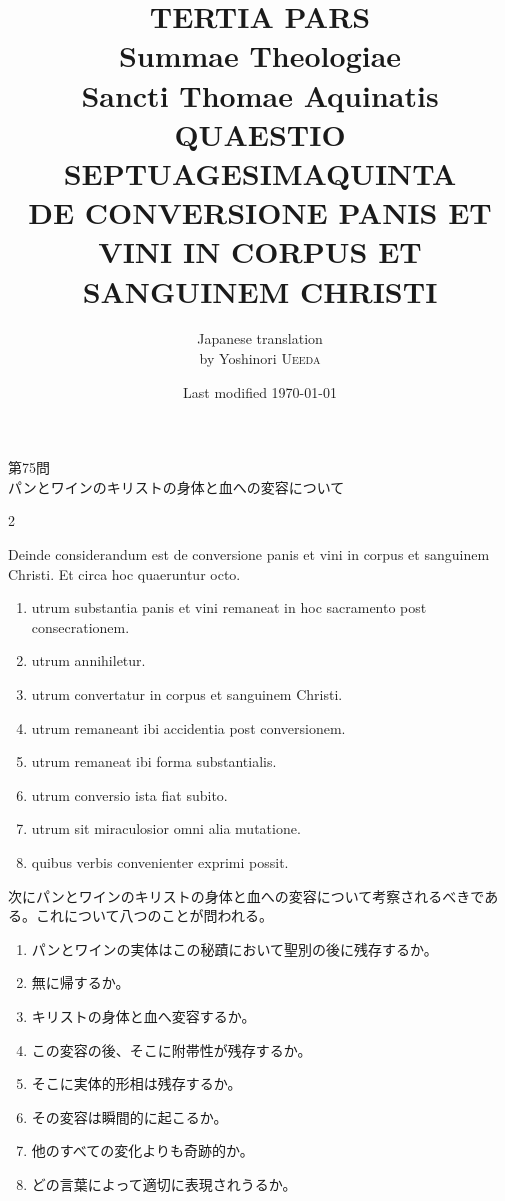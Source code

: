 \documentclass[paper=a4paper,fontsize=10pt,jafontsize=9pt,titlepage]{jlreq}
\title{{\bfseries TERTIA PARS}\\{\Huge Summae Theologiae}\\Sancti Thomae
Aquinatis\\{\sffamily QUAESTIO SEPTUAGESIMAQUINTA}\\DE CONVERSIONE
PANIS ET VINI IN CORPUS ET SANGUINEM CHRISTI}
\author{Japanese translation\\by Yoshinori {\scshape Ueeda}}
\date{Last modified \today}
\begin{document}
\maketitle
\pagestyle{fancy}

\begin{center}
{\Large 第75問\\パンとワインのキリストの身体と血への変容について}
\end{center}

\begin{paracol}{2}

Deinde considerandum est de conversione panis et vini in corpus et
 sanguinem Christi. Et circa hoc quaeruntur octo. 

\begin{enumerate}
 \item utrum substantia panis et vini remaneat in hoc sacramento post
 consecrationem.
 \item utrum annihiletur.
 \item utrum convertatur in corpus et sanguinem Christi.
 \item utrum remaneant ibi accidentia post conversionem.
 \item utrum remaneat ibi forma substantialis.
 \item utrum conversio ista fiat subito.
 \item utrum sit miraculosior omni alia mutatione.
 \item quibus verbis convenienter exprimi possit.
\end{enumerate}

\switchcolumn

次にパンとワインのキリストの身体と血への変容について考察されるべきであ
 る。これについて八つのことが問われる。

\begin{enumerate}
 \item パンとワインの実体はこの秘蹟において聖別の後に残存するか。
 \item 無に帰するか。
 \item キリストの身体と血へ変容するか。
 \item この変容の後、そこに附帯性が残存するか。
 \item そこに実体的形相は残存するか。
 \item その変容は瞬間的に起こるか。
 \item 他のすべての変化よりも奇跡的か。
 \item どの言葉によって適切に表現されうるか。
\end{enumerate}

\end{paracol}
\newpage
{}
{}
\setcounter{section}{1}
\setcounter{subsection}{0}
\end{document}

